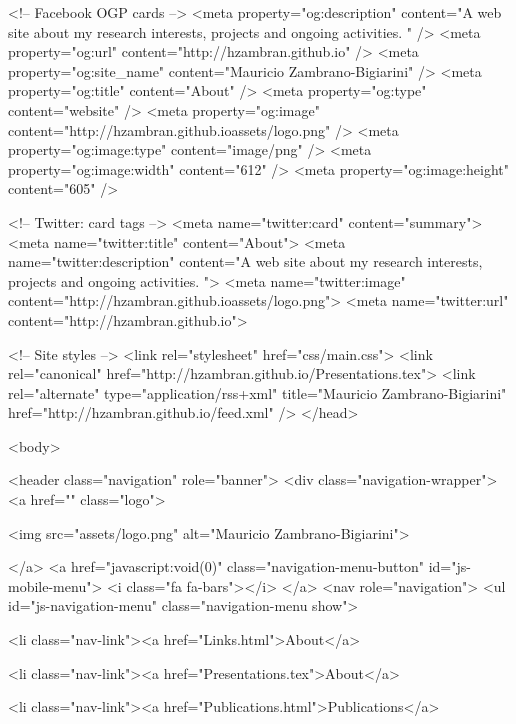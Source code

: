 	<!-- Facebook OGP cards -->
  <meta property="og:description" content="A web site about my research interests, projects and ongoing activities.
" />
  <meta property="og:url" content="http://hzambran.github.io" />
  <meta property="og:site_name" content="Mauricio Zambrano-Bigiarini" />
  <meta property="og:title" content="About" />
  <meta property="og:type" content="website" />
  <meta property="og:image" content="http://hzambran.github.ioassets/logo.png" />
  <meta property="og:image:type" content="image/png" />
  <meta property="og:image:width" content="612" />
  <meta property="og:image:height" content="605" />

  <!-- Twitter: card tags -->
  <meta name="twitter:card" content="summary">
  <meta name="twitter:title" content="About">
  <meta name="twitter:description" content="A web site about my research interests, projects and ongoing activities.
">
  <meta name="twitter:image" content="http://hzambran.github.ioassets/logo.png">
  <meta name="twitter:url" content="http://hzambran.github.io">

  

	<!-- Site styles -->
  <link rel="stylesheet" href="css/main.css">
  <link rel="canonical" href="http://hzambran.github.io/Presentations.tex">
  <link rel="alternate" type="application/rss+xml" title="Mauricio Zambrano-Bigiarini" href="http://hzambran.github.io/feed.xml" />
</head>


  <body>

    <header class="navigation" role="banner">
  <div class="navigation-wrapper">
    <a href="" class="logo">
    	
      <img src="assets/logo.png" alt="Mauricio Zambrano-Bigiarini">
      
    </a>
    <a href="javascript:void(0)" class="navigation-menu-button" id="js-mobile-menu">
    	<i class="fa fa-bars"></i>
    </a>
    <nav role="navigation">
      <ul id="js-navigation-menu" class="navigation-menu show">
      	
          
          <li class="nav-link"><a href="Links.html">About</a>
          
        
          
          <li class="nav-link"><a href="Presentations.tex">About</a>
          
        
          
          <li class="nav-link"><a href="Publications.html">Publications</a>
          
        
          
